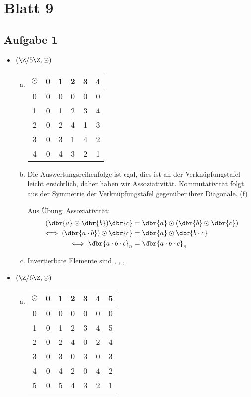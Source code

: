 \section*{Blatt 9}
%

\subsection*{Aufgabe 1}

\begin{itemize}
  \item $ (\Z / 5 \Z, \odot) $
  \begin{enumerate}[a)]
  \item
    \begin{tabular}{c|ccccc}
    $\odot$ & 0 & 1 & 2 & 3 & 4 \\
    \hline
    0 & 0 & 0 & 0 & 0 & 0 \\
    1 & 0 & 1 & 2 & 3 & 4 \\
    2 & 0 & 2 & 4 & 1 & 3 \\
    3 & 0 & 3 & 1 & 4 & 2 \\
    4 & 0 & 4 & 3 & 2 & 1 \\
    \end{tabular}
    \item Die Auswertungsreihenfolge ist egal, dies ist an der Verknüpfungstafel leicht ersichtlich, daher haben wir Assoziativität. Kommutativität folgt aus der Symmetrie der Verknüpfungstafel gegenüber ihrer Diagonale. (f)

    Aus Übung:
    Assoziativität:
    \begin{align*}
      (\dbr{a} \odot \dbr{b}) \dbr{c} &= \dbr{a} \odot (\dbr{b} \odot \dbr{c}) \\
      \iff (\dbr{a \cdot b}) \odot \dbr{c} &= \dbr{a} \odot \dbr{b \cdot c} \\
      \iff \dbr{a \cdot b \cdot c}_n &= \dbr{a \cdot b \cdot c}_n \\

    \end{align*}
    \item Invertierbare Elemente sind , , , 

    \end{enumerate}



  \item $ (\Z / 6 \Z, \odot) $
  \begin{enumerate}[a)]
  \item
  \begin{tabular}{c|cccccc}
    $\odot$ & 0 & 1 & 2 & 3 & 4 & 5\\
    \hline
    0 & 0 & 0 & 0 & 0 & 0 & 0 \\
    1 & 0 & 1 & 2 & 3 & 4 & 5 \\
    2 & 0 & 2 & 4 & 0 & 2 & 4 \\
    3 & 0 & 3 & 0 & 3 & 0 & 3 \\
    4 & 0 & 4 & 2 & 0 & 4 & 2 \\
    5 & 0 & 5 & 4 & 3 & 2 & 1 \\


\end{tabular}
\end{enumerate}
\end{itemize}
